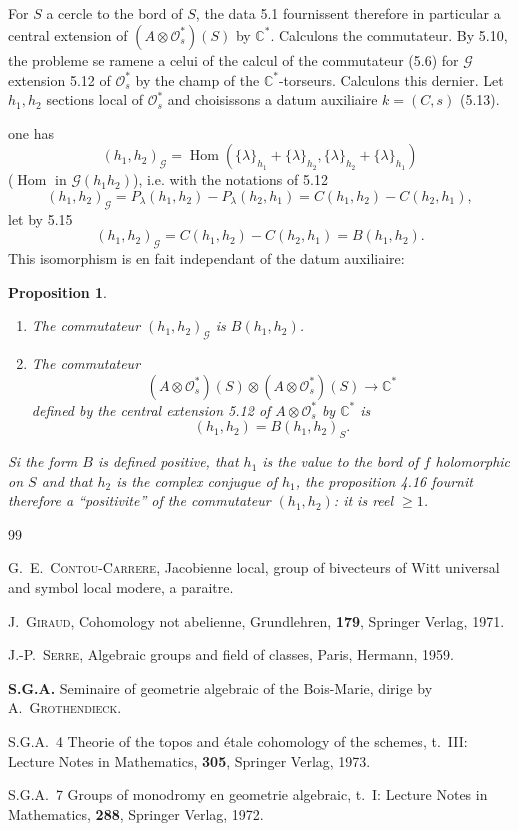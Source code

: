 \documentclass[12pt,a4paper]{article}
\theoremstyle{plain}
\newtheorem{proposition}[theorem]{Proposition}
\theoremstyle{definition}
\theoremstyle{remark}
\DeclareMathOperator{\Hom}{Hom}
\newcommand{\cO}{\mathcal{O}}
\newcommand{\C}{\mathbb{C}}
\providecommand{\cO}{\mathcal{O}}
\providecommand{\Hom}{\operatorname{Hom}}
\begin{document}
\subsection{}

For $S$ a cercle to the bord of $S$, the data 5.1 fournissent therefore in particular
a central extension of $(A \otimes \cO_s^*)(S)$ by $\C^*$. Calculons the commutateur. By 5.10,
the probleme se ramene a celui of the calcul of the commutateur (5.6) for $\mathscr{G}$ extension 5.12
of $\cO_s^*$ by the champ of the $\C^*$-torseurs. Calculons this dernier. Let $h_1, h_2$ sections local
of $\cO_s^*$ and choisissons a datum auxiliaire $k = (C, s)$ (5.13).

one has
\[
(h_1, h_2)_\mathscr{G} = \Hom(\{\lambda\}_{h_1} + \{\lambda\}_{h_2}, \{\lambda\}_{h_2} + \{\lambda\}_{h_1})
\]
($\Hom$ in $\mathscr{G}(h_1 h_2)$), i.e. with the notations of 5.12
\[
(h_1, h_2)_\mathscr{G} = P_\lambda(h_1, h_2) - P_\lambda(h_2, h_1) = C(h_1, h_2) - C(h_2, h_1),
\]
let by 5.15
\[
(h_1, h_2)_\mathscr{G} = C(h_1, h_2) - C(h_2, h_1) = B(h_1, h_2).
\]
This isomorphism is en fait independant of the datum auxiliaire:

\begin{proposition}
\begin{enumerate}[label=(\roman*)]
\item The commutateur $(h_1, h_2)_\mathscr{G}$ is $B(h_1, h_2)$.
\item The commutateur
\[
(A \otimes \cO_s^*)(S) \otimes (A \otimes \cO_s^*)(S) \to \C^*
\]
defined by the central extension \emph{5.12} of $A \otimes \cO_s^*$ by $\C^*$ is
\[
(h_1, h_2) = B(h_1, h_2)_S.
\]
\end{enumerate}
Si the form $B$ is defined positive, that $h_1$ is the value to the bord of $f$ holomorphic
on $S$ and that $h_2$ is the complex conjugue of $h_1$, the proposition \emph{4.16} fournit therefore a
``positivite'' of the commutateur $(h_1, h_2)$: it is reel $\geq 1$.
\end{proposition}

\begin{thebibliography}{99}

G.~E.~\textsc{Contou-Carrere}, Jacobienne local, group of bivecteurs of Witt universal and symbol local modere, a paraitre.

J.~\textsc{Giraud}, Cohomology not abelienne, Grundlehren, \textbf{179}, Springer Verlag, 1971.

J.-P.~\textsc{Serre}, Algebraic groups and field of classes, Paris, Hermann, 1959.

\textbf{S.G.A.} Seminaire of geometrie algebraic of the Bois-Marie, dirige by A.~\textsc{Grothendieck}.

\qquad S.G.A.~4 Theorie of the topos and étale cohomology of the schemes, t.~III: Lecture Notes in Mathematics, \textbf{305}, Springer Verlag, 1973.

\qquad S.G.A.~7 Groups of monodromy en geometrie algebraic, t.~I: Lecture Notes in Mathematics, \textbf{288}, Springer Verlag, 1972.

\end{thebibliography}
\end{document}
